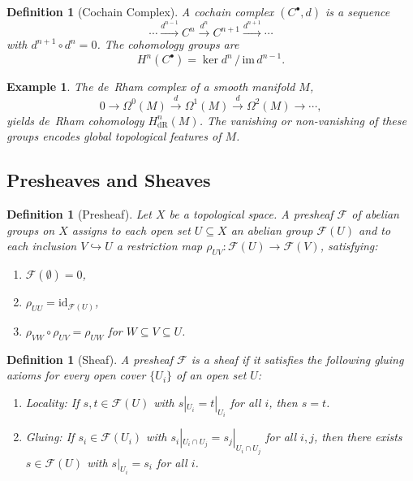 \documentclass[12pt,a4paper]{article}
\newtheorem{definition}[theorem]{Definition}
\newtheorem{example}[theorem]{Example}
\newcommand{\sheaf}{\mathscr{F}}
\begin{document}
\begin{definition}[Cochain Complex]
  A \emph{cochain complex} $(C^{\bullet}, d)$ is a sequence
  \[
    \cdots \xrightarrow{d^{n-1}} C^n \xrightarrow{d^n} C^{n+1} \xrightarrow{d^{n+1}} \cdots
  \]
  with $d^{n+1} \circ d^n = 0$. The \emph{cohomology groups} are
  \[
    H^n(C^{\bullet}) = \ker d^n \,/\, \mathrm{im}\, d^{n-1}.
  \]
\end{definition}

\begin{example}
  The de~Rham complex of a smooth manifold $M$,
  \[
    0 \to \Omega^0(M) \xrightarrow{d} \Omega^1(M) \xrightarrow{d} \Omega^2(M) \to \cdots,
  \]
  yields de~Rham cohomology $H^n_{\mathrm{dR}}(M)$. The vanishing or non-vanishing 
  of these groups encodes global topological features of $M$.
\end{example}

\subsection{Presheaves and Sheaves}

\begin{definition}[Presheaf]
  Let $X$ be a topological space. A \emph{presheaf} $\sheaf$ of abelian groups on $X$ 
  assigns to each open set $U \subseteq X$ an abelian group $\sheaf(U)$ and to each 
  inclusion $V \hookrightarrow U$ a restriction map $\rho_{UV}\colon \sheaf(U) \to \sheaf(V)$, 
  satisfying:
  \begin{enumerate}[label=(\alph*)]
    \item $\sheaf(\emptyset) = 0$,
    \item $\rho_{UU} = \mathrm{id}_{\sheaf(U)}$,
    \item $\rho_{VW} \circ \rho_{UV} = \rho_{UW}$ for $W \subseteq V \subseteq U$.
  \end{enumerate}
\end{definition}

\begin{definition}[Sheaf]
  A presheaf $\sheaf$ is a \emph{sheaf} if it satisfies the following gluing axioms 
  for every open cover $\{U_i\}$ of an open set $U$:
  \begin{enumerate}[label=(\roman*)]
    \item \emph{Locality:} If $s, t \in \sheaf(U)$ with $s|_{U_i} = t|_{U_i}$ for all $i$, 
      then $s = t$.
    \item \emph{Gluing:} If $s_i \in \sheaf(U_i)$ with $s_i|_{U_i \cap U_j} = s_j|_{U_i \cap U_j}$ 
      for all $i, j$, then there exists $s \in \sheaf(U)$ with $s|_{U_i} = s_i$ for all $i$.
  \end{enumerate}
\end{definition}
\end{document}
